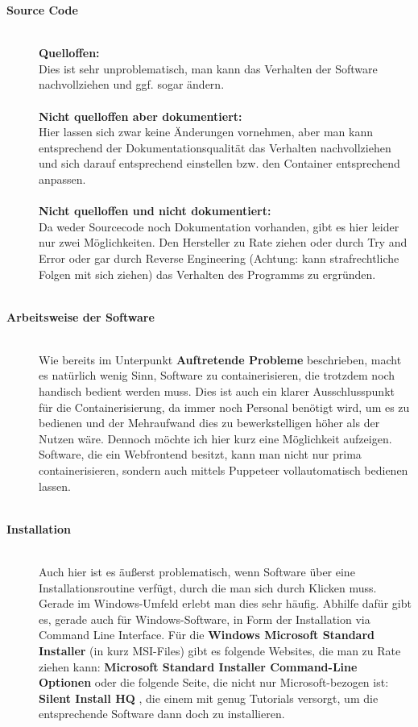 \begin{description}
	\item[\textbf{Source Code}]\hfill \\


	\textbf{Quelloffen:}\\ Dies ist sehr unproblematisch, man kann das Verhalten der Software nachvollziehen und ggf. sogar ändern. \\  \\
	\textbf{Nicht quelloffen aber dokumentiert:}\\ Hier lassen sich zwar keine Änderungen vornehmen, aber man kann entsprechend der Dokumentationsqualität das Verhalten nachvollziehen und sich darauf entsprechend einstellen bzw. den Container entsprechend anpassen. \\ \\
	\textbf{Nicht quelloffen und nicht dokumentiert:}\\ Da weder Sourcecode noch Dokumentation vorhanden, gibt es hier leider nur zwei Möglichkeiten. Den Hersteller zu Rate ziehen oder durch Try and Error oder gar durch Reverse Engineering \cite{eilam2011reversing} (Achtung: kann strafrechtliche Folgen mit sich ziehen) das Verhalten des Programms zu ergründen. \\ \\
	\item[\textbf{Arbeitsweise der Software}]\hfill \\ Wie bereits im Unterpunkt \textbf{Auftretende Probleme} beschrieben, macht es natürlich wenig Sinn, Software zu containerisieren, die trotzdem noch handisch bedient werden muss. Dies ist auch ein klarer Ausschlusspunkt für die Containerisierung, da immer noch Personal benötigt wird, um es zu bedienen und der Mehraufwand dies zu bewerkstelligen höher als der Nutzen wäre. Dennoch möchte ich hier kurz eine Möglichkeit aufzeigen. Software, die ein Webfrontend besitzt, kann man nicht nur prima containerisieren, sondern auch mittels Puppeteer vollautomatisch bedienen lassen. \\ \\
	\item[\textbf{Installation}]\hfill \\ Auch hier ist es äußerst problematisch, wenn Software über eine Installationsroutine verfügt, durch die man sich durch Klicken muss. Gerade im Windows-Umfeld erlebt man dies sehr häufig. Abhilfe dafür gibt es, gerade auch für Windows-Software, in Form der Installation via Command Line Interface. Für die \textbf{Windows Microsoft Standard Installer} (in kurz MSI-Files) gibt es folgende Websites, die man zu Rate ziehen kann: \textbf{Microsoft Standard Installer Command-Line Optionen} \cite{microsoft} oder die folgende Seite, die nicht nur Microsoft-bezogen ist: \textbf{Silent Install HQ} \cite{silent}, die einem mit genug Tutorials versorgt, um die entsprechende Software dann doch zu installieren.\\ \\

\end{description}
